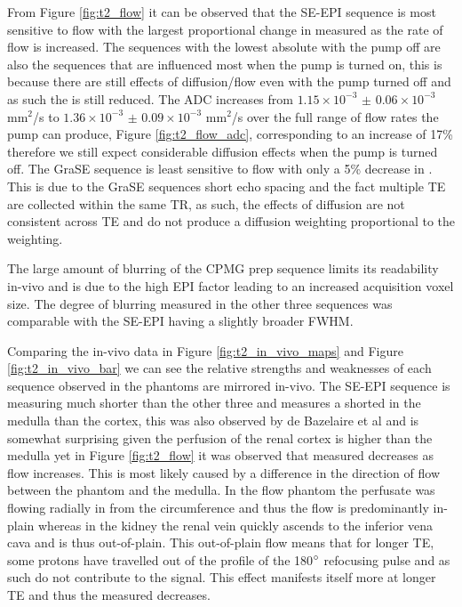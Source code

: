 From Figure \ref{fig:t2_flow} it can be observed that the \ac{SE}-\ac{EPI} sequence is most sensitive to flow with the largest proportional change in measured \ttwo as the rate of flow is increased.  The sequences with the lowest absolute \ttwo with the pump off are also the sequences that are influenced most when the pump is turned on, this is because there are still effects of diffusion/flow even with the pump turned off and as such the \ttwo is still reduced. The \ac{ADC} increases from $1.15\times 10^{-3}$ $\pm$ $0.06\times 10^{-3}$ mm$^2$/s to $1.36\times 10^{-3}$ $\pm$ $0.09\times 10^{-3}$ mm$^2$/s over the full range of flow rates the pump can produce, Figure \ref{fig:t2_flow_adc}, corresponding to an increase of 17\% therefore we still expect considerable diffusion effects when the pump is turned off. The \ac{GraSE} sequence is least sensitive to flow with only a 5\% decrease in \ttwo. This is due to the \ac{GraSE} sequences short echo spacing and the fact multiple \ac{TE} are collected within the same \ac{TR}, as such, the effects of diffusion are not consistent across \ac{TE} and do not produce a diffusion weighting proportional to the \ttwo weighting.

The large amount of blurring of the \ac{CPMG} \ttwo prep sequence limits its readability in-vivo and is due to the high \ac{EPI} factor leading to an increased acquisition voxel size. The degree of blurring measured in the other three sequences was comparable with the \ac{SE}-\ac{EPI} having a slightly broader \ac{FWHM}.

Comparing the in-vivo data in Figure \ref{fig:t2_in_vivo_maps} and Figure \ref{fig:t2_in_vivo_bar} we can see the relative strengths and weaknesses of each sequence observed in the phantoms are mirrored in-vivo. The \ac{SE}-\ac{EPI} sequence is measuring much shorter \ttwo than the other three and measures a shorted \ttwo in the medulla than the cortex, this was also observed by de Bazelaire et al \cite{de_bazelaire_mr_2004} and is somewhat surprising given the perfusion of the renal cortex is higher than the medulla \cite{buchanan_quantitative_2019, nery_consensus-based_2020} yet in Figure \ref{fig:t2_flow} it was observed that measured \ttwo decreases as flow increases. This is most likely caused by a difference in the direction of flow between the phantom and the medulla. In the flow phantom the perfusate was flowing radially in from the circumference and thus the flow is predominantly in-plain whereas in the kidney the renal vein quickly ascends to the inferior vena cava and is thus out-of-plain. This out-of-plain flow means that for longer \ac{TE}, some protons have travelled out of the profile of the 180$\degree$ refocusing pulse and as such do not contribute to the signal. This effect manifests itself more at longer \ac{TE} and thus the measured \ttwo decreases.

